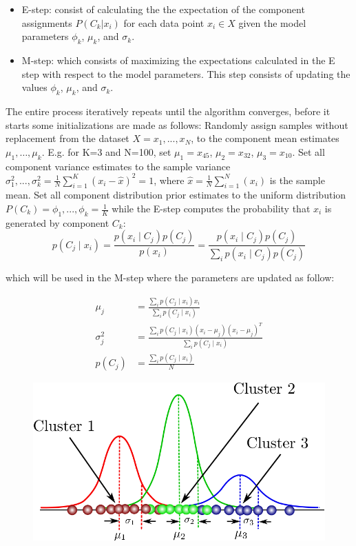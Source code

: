\begin{itemize}
\item	 E-step: consist of calculating the the expectation of the component assignments $P(C_k | x_i)$ for each data point $x_i \in X$ given the model parameters $\phi_k$,  $\mu_k$, and $\sigma_k$.
\end{itemize}
\begin{itemize}
\item	M-step: which consists of maximizing the expectations calculated in the E step with respect to the model parameters. This step consists of updating the values $\phi_k$,  $\mu_k$, and $\sigma_k$.
\end{itemize}
The entire process iteratively repeats until the algorithm converges, before it starts some initializations are made as follows:
Randomly assign samples without replacement from the dataset $X={x_1, ..., x_N}$, to the component mean estimates $\mu_1, … , \mu_k$. E.g. for K=3 and N=100, set $\mu_1= x_45$, $\mu_2 = x_32$, $\mu_3 = x_10$. 
Set all component variance estimates to the sample variance 
$\sigma_1^2,...,\sigma_k^2=\frac{1}{N}\sum_{i=1}^{K} (x_i -\hat{x})^{2}=1$, where $\hat{x}=\frac{1}{N}\sum_{i=1}^{N}(x_i)$ is the sample mean.
Set all component distribution prior estimates to the uniform distribution  
$P(C_k) = \phi_1,..., \phi_k  = \frac{1}{K}$
while the E-step computes the probability that $x_i$ is generated by component $C_k$:
\begin{equation}
	 p(C_j \mid x_i ) = \frac{ p(x_i \mid C_j)p(C_j) }{p(x_i)} = \frac{p(x_i \mid C_j)p(C_j)}{\sum_ip(x_i \mid C_j)p(C_j)}
	 \label{eq:}	
\end{equation}

which will be used in the M-step where the parameters are updated as follow:	

\begin{align}
\mu_j&=\frac{ \sum_{i} p(C_j \mid x_i )x_i}{\sum_{i} {p(C_j \mid x_i )}} \\
\sigma_j^2 &=\frac{\sum_{i}{p ( C_j \mid x_i)}  (x_i - \mu_j) (x_i - \mu_j)^T} {\sum_{i} {p(C_j \mid x_i )}} \\
p ( C_j ) &= \frac{ \sum_{i} p(C_j \mid x_i )}{N}
\end{align}

\begin{figure}
\centering
\includegraphics[scale=0.3]{Figures/GMM}
\caption{}
\label{fig:GMM}
\end{figure}


